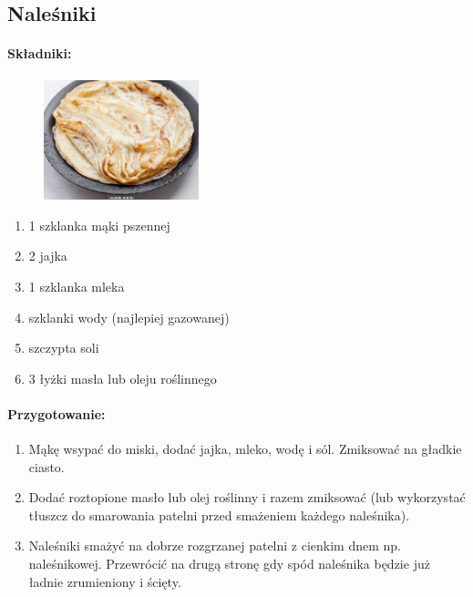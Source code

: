 \documentclass{article}
\begin{document}
    \subsection{Naleśniki}
    \bigskip
    \paragraph{Składniki:}
    \begin{figure}
        \includegraphics[width=0.4\textwidth]{nalesniki.jpg}
    \end{figure}
    \begin{enumerate}
        \item 1 szklanka mąki pszennej
        \item 2 jajka
        \item 1 szklanka mleka
        \item {} szklanki wody (najlepiej gazowanej)
        \item szczypta soli
        \item 3 łyżki masła lub oleju roślinnego
    \end{enumerate}

    \paragraph{Przygotowanie:}
    \begin{enumerate}
        \item Mąkę wsypać do miski, dodać jajka, mleko, wodę i sól. Zmiksować na
            gładkie ciasto.
        \item Dodać roztopione masło lub olej roślinny i razem zmiksować (lub
            wykorzystać tłuszcz do smarowania patelni przed smażeniem każdego
            naleśnika).
        \item Naleśniki smażyć na dobrze rozgrzanej patelni z cienkim dnem np.
            naleśnikowej. Przewrócić na drugą stronę gdy spód naleśnika będzie
            już ładnie zrumieniony i ścięty.
    \end{enumerate}
    \newpage
\end{document}
